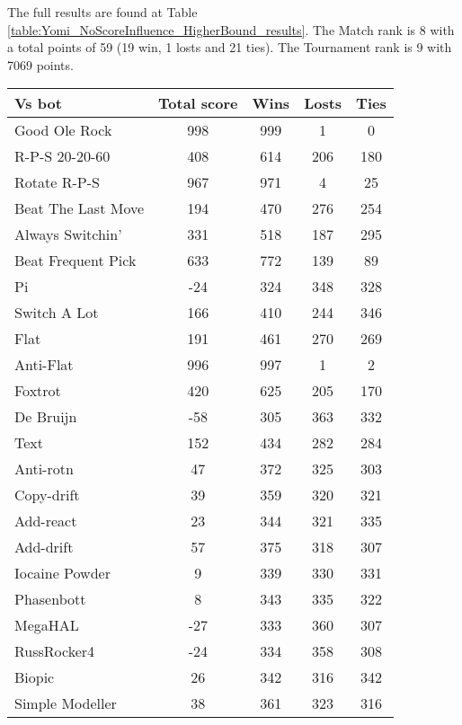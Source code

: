 The full results are found at Table \ref{table:Yomi_NoScoreInfluence_HigherBound_results}. The Match rank is 8 with a total points of 59 (19 win, 1 losts and 21 ties). The Tournament rank is 9 with 7069 points.

\begin{table*}
    \caption{Yomi_NoScoreInfluence_HigherBound results}
    \label{table:Yomi_NoScoreInfluence_HigherBound_results}
    \centering
    \begin{tabular}{|l|c|c|c|c|}
        \hline
        \textbf{Vs bot} & \textbf{Total score} & \textbf{Wins} & \textbf{Losts} & \textbf{Ties} \\ \hline
Good Ole Rock & 998 & 999 & 1 & 0 \\ \hline 
R-P-S 20-20-60 & 408 & 614 & 206 & 180 \\ \hline 
Rotate R-P-S & 967 & 971 & 4 & 25 \\ \hline 
Beat The Last Move & 194 & 470 & 276 & 254 \\ \hline 
Always Switchin' & 331 & 518 & 187 & 295 \\ \hline 
Beat Frequent Pick & 633 & 772 & 139 & 89 \\ \hline 
Pi & -24 & 324 & 348 & 328 \\ \hline 
Switch A Lot & 166 & 410 & 244 & 346 \\ \hline 
Flat & 191 & 461 & 270 & 269 \\ \hline 
Anti-Flat & 996 & 997 & 1 & 2 \\ \hline 
Foxtrot & 420 & 625 & 205 & 170 \\ \hline 
De Bruijn & -58 & 305 & 363 & 332 \\ \hline 
Text & 152 & 434 & 282 & 284 \\ \hline 
Anti-rotn & 47 & 372 & 325 & 303 \\ \hline 
Copy-drift & 39 & 359 & 320 & 321 \\ \hline 
Add-react & 23 & 344 & 321 & 335 \\ \hline 
Add-drift & 57 & 375 & 318 & 307 \\ \hline 
Iocaine Powder & 9 & 339 & 330 & 331 \\ \hline 
Phasenbott & 8 & 343 & 335 & 322 \\ \hline 
MegaHAL & -27 & 333 & 360 & 307 \\ \hline 
RussRocker4 & -24 & 334 & 358 & 308 \\ \hline 
Biopic & 26 & 342 & 316 & 342 \\ \hline 
Simple Modeller & 38 & 361 & 323 & 316 \\ \hline 

\end{tabular}
\end{table*}
